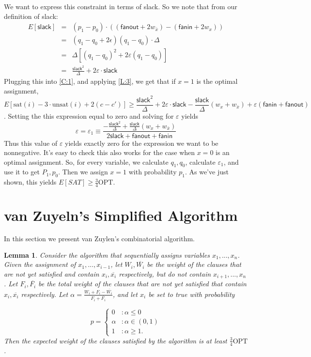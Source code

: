 \documentclass[11pt,letter]{article}
\newtheorem{lemma}[theorem]{Lemma}
\numberwithin{theorem}{section}
\begin{document}
We want to express this constraint in terms of slack. So we note that from our definition of slack:
\begin{eqnarray}
E[\mathsf{slack}] &=& (p_1-p_0)\cdot ((\mathsf{fanout} + 2w_{\bar{x}}) -(\mathsf{fanin} + 2w_x))
\\&=& (q_1-q_0+2\epsilon)(q_1-q_0)\cdot\Delta
\\&=& \Delta[(q_1-q_0)^2 + 2\varepsilon(q_1-q_0)]
\\&=& \frac{\mathsf{slack}^2}{\Delta} +2\varepsilon\cdot\mathsf{slack}
\end{eqnarray}
Plugging this into \ref{C:1}, and applying \ref{L:3}, we get that if $x=1$ is the optimal assignment,
\[E[\textrm{sat}(i) - 3\cdot\textrm{unsat}(i)+ 2(c-c')] \ge \frac{\mathsf{slack}^2}{\Delta} +2\varepsilon\cdot\mathsf{slack} - \frac{\mathsf{slack}}{\Delta}(w_x + w_{\bar{x}}) + \varepsilon(\mathsf{fanin} + \mathsf{fanout})\].
Setting the this expression equal to zero and solving for $\varepsilon$ yields
\begin{equation}
\varepsilon = \varepsilon_1 \equiv \frac{-\frac{\mathsf{slack}^2}{\Delta} + \frac{\mathsf{slack}}{\Delta}(w_x + w_{\bar{x}})}{2\mathsf{slack}+ \mathsf{fanout} + \mathsf{fanin}}
\end{equation}
Thus this value of $\varepsilon$ yields exactly zero for the expression we want to be nonnegative. It's easy to check this also works for the case when $x=0$ is an optimal assignment. So, for every variable, we calculate $q_1, q_0$, calculate $\varepsilon_1$, and use it to get $P_1, p_0$. Then we assign $x=1$ with probability $p_1$. As we've just shown, this yields $E[SAT] \ge \frac{3}{4}\textrm{OPT}$.


\section{van Zuyeln's Simplified Algorithm}\label{S:vZ}

In this section we present van Zuylen's combinatorial algorithm.

\begin{lemma}
Consider the algorithm that sequentially assigns variables $x_1,...,x_n$. Given the assignment of $x_1,...,x_{i-1}$,
 let $W_i, \overline{W_i}$ be the weight of the clauses that are not yet satisfied and contain $x_i, \overline{x_i}$ respectively,
 but do not contain $x_{i+1}, ..., x_n$. Let $F_i, \overline{F_i}$ be the total weight of the clauses that are not yet satisfied
 that contain $x_i, \overline{x_i}$ respectively. Let $\alpha = \frac{W_i + F_i - \overline{W_i}}{F_i + \overline{F_i}}$, and let $x_i$ be set to true with probability

\begin{displaymath}
  p = \left\{
     \begin{array}{lr}
       0 & : \alpha \leq 0\\
       \alpha & : \alpha \in (0,1) \\
       1 & : \alpha \geq 1.
     \end{array}
   \right.
\end{displaymath}
Then the expected weight of the clauses satisfied by the algorithm is at least $\frac{3}{4} \textrm{OPT}$.
\end{lemma}
\end{document}
